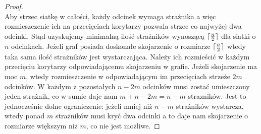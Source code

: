 \documentclass[brudnopis]{xmgr}
\DeclarePairedDelimiter\ceil{\lceil}{\rceil}
\theoremstyle{definition}
\begin{document}
\begin{proof}
 \\\indent Aby strzec siatkę w całości, każdy odcinek wymaga strażnika a więc rozmieszczenie ich na przecięciach korytarzy pozwala strzec co najwyżej dwa odcinki. Stąd uzyskujemy minimalną ilość strażników wynoszącą $\ceil{\frac{n}{2}}$ dla siatki o $n$ odcinkach. Jeżeli graf posiada doskonałe skojarzenie o rozmiarze $\ceil{\frac{n}{2}}$ wtedy taka sama ilość strażników jest wystarczająca. Należy ich rozmieścić w każdym przecięciu korytarzy odpowiadającemu skojarzeniu w grafie. Jeżeli skojarzenie ma moc $m$, wtedy rozmieszczenie w odpowiadającym im przecięciach strzeże $2m$ odcinków. W każdym z pozostałych $n - 2m$ odcinków musi zostać umieszczony jeden strażnik, co w sumie daje nam $m + n - 2m = n - m$ strazników. Jest to jednocześnie dolne ograniczenie: jeżeli mniej niż $n - m$ strażników wystarcza, wtedy ponad $m$ strażników musi kryć dwa odcinki a to daje nam skojarzenie o rozmiarze większym niż $m$, co nie jest możliwe.
\end{proof}
\end{document}

